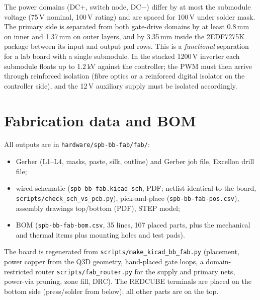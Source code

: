 \documentclass[10pt,a4paper]{article}
\begin{document}
The power domains (DC$+$, switch node, DC$-$) differ by at most the submodule voltage (75\,V nominal, 100\,V rating) and are spaced for 100\,V under solder mask. The primary side is separated from both gate-drive domains by at least 0.8\,mm on inner and 1.37\,mm on outer layers, and by 3.35\,mm inside the 2EDF7275K package between its input and output pad rows. This is a \emph{functional} separation for a lab board with a single submodule. In the stacked 1200\,V inverter each submodule floats up to 1.2\,kV against the controller; the PWM must then arrive through reinforced isolation (fibre optics or a reinforced digital isolator on the controller side), and the 12\,V auxiliary supply must be isolated accordingly.

\section{Fabrication data and BOM}
All outputs are in \texttt{hardware/spb-bb-fab/fab/}:
\begin{itemize}\itemsep0pt
\item Gerber (L1--L4, masks, paste, silk, outline) and Gerber job file, Excellon drill file;
\item wired schematic (\texttt{spb-bb-fab.kicad\_sch}, PDF; netlist identical to the board, \texttt{scripts/check\_sch\_vs\_pcb.py}), pick-and-place (\texttt{spb-bb-fab-pos.csv}), assembly drawings top/bottom (PDF), STEP model;
\item BOM (\texttt{spb-bb-fab-bom.csv}, 35 lines, 107 placed parts, plus the mechanical and thermal items plus mounting holes and test pads).
\end{itemize}
The board is regenerated from \texttt{scripts/make\_kicad\_bb\_fab.py} (placement, power copper from the Q3D geometry, hand-placed gate loops, a domain-restricted router \texttt{scripts/fab\_router.py} for the supply and primary nets, power-via pruning, zone fill, DRC). The REDCUBE terminals are placed on the bottom side (press/solder from below); all other parts are on the top.
\end{document}
